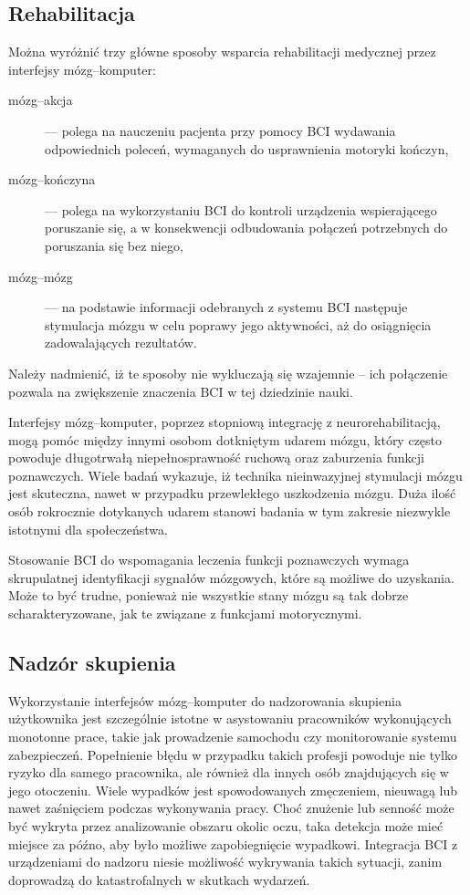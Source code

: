 \documentclass[skorowidz,skroty]{dyplomWEZUT}
\begin{document}
\subsection{Rehabilitacja}
Można wyróżnić trzy główne sposoby wsparcia rehabilitacji medycznej przez interfejsy mózg--komputer\cite{bci_lab}:
\begin{description}
    \item [mózg--akcja] --- polega na nauczeniu pacjenta przy pomocy BCI wydawania odpowiednich poleceń, wymaganych do usprawnienia motoryki kończyn,
    \item [mózg--kończyna] --- polega na wykorzystaniu BCI do kontroli urządzenia wspierającego poruszanie się, a w konsekwencji odbudowania połączeń potrzebnych do poruszania się bez niego,
    \item [mózg--mózg] --- na podstawie informacji odebranych z systemu BCI następuje stymulacja mózgu w celu poprawy jego aktywności, aż do osiągnięcia zadowalających rezultatów.
\end{description}
Należy nadmienić, iż te sposoby nie wykluczają się wzajemnie -- ich połączenie pozwala na zwiększenie znaczenia BCI w tej dziedzinie nauki.

Interfejsy mózg--komputer, poprzez stopniową integrację z neurorehabilitacją, mogą pomóc między innymi osobom dotkniętym udarem mózgu, który często powoduje długotrwałą niepełnosprawność ruchową oraz zaburzenia funkcji poznawczych. Wiele badań wykazuje, iż technika nieinwazyjnej stymulacji mózgu jest skuteczna, nawet w przypadku przewlekłego uszkodzenia mózgu\cite{bci_lab}. Duża ilość osób rokrocznie dotykanych udarem stanowi badania w tym zakresie niezwykle istotnymi dla społeczeństwa.

Stosowanie BCI do wspomagania leczenia funkcji poznawczych wymaga skrupulatnej identyfikacji sygnałów mózgowych, które są możliwe do uzyskania. Może to być trudne, ponieważ nie wszystkie stany mózgu są tak dobrze scharakteryzowane, jak te związane z funkcjami motorycznymi\cite{bci_handbook}.


\subsection{Nadzór skupienia}
Wykorzystanie interfejsów mózg--komputer do nadzorowania skupienia użytkownika jest szczególnie istotne w asystowaniu pracowników wykonujących monotonne prace, takie jak prowadzenie samochodu czy monitorowanie systemu zabezpieczeń. Popełnienie błędu w przypadku takich profesji powoduje nie tylko ryzyko dla samego pracownika, ale również dla innych osób znajdujących się w jego otoczeniu. Wiele wypadków jest spowodowanych zmęczeniem, nieuwagą lub nawet zaśnięciem podczas wykonywania pracy. Choć znużenie lub senność może być wykryta przez analizowanie obszaru okolic oczu, taka detekcja może mieć miejsce za późno, aby było możliwe zapobiegnięcie wypadkowi. Integracja BCI z urządzeniami do nadzoru niesie możliwość wykrywania takich sytuacji, zanim doprowadzą do katastrofalnych w skutkach wydarzeń. 
\end{document}
